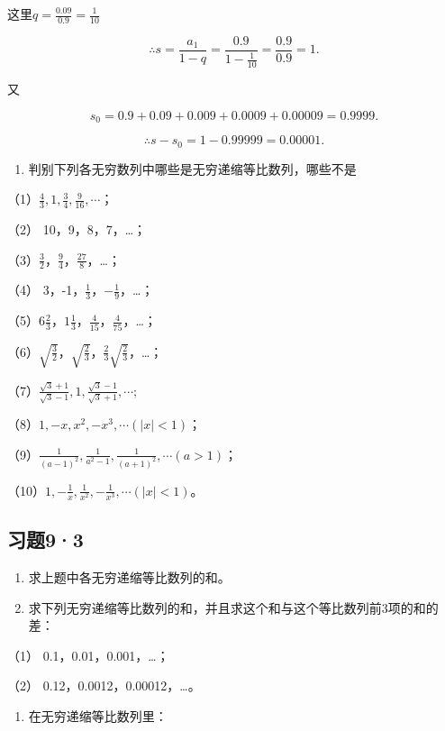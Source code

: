  这里\(q = \frac{0.09}{0.9} = \frac{1}{10}\)

\[
\therefore s = \frac{a_{1}}{1 - q} = \frac{0.9}{1 - \frac{1}{10}} = \frac{0.9}{0.9} = 1.
\]

又

\[
s_{0} = 0.9 + 0.09 + 0.009 + 0.0009 + 0.00009 = 0.9999.
\]

\[
\therefore s - s_{0} = 1 - 0.99999 = 0.00001.
\]

\begin{enumerate}
\item
  判别下列各无穷数列中哪些是无穷递缩等比数列，哪些不是
\end{enumerate}

（1）\(\frac{4}{3}, 1, \frac{3}{4}, \frac{9}{16}, \cdots\)；

（2） 10，9，8，7，\ldots；

（3）\(\frac{3}{2}\)，\(\frac{9}{4}\)，\(\frac{27}{8}\)，\ldots；

（4） 3，-1，\(\frac{1}{3}\)，\(-\frac{1}{9}\)，\ldots；

（5）\(6\frac{2}{3}\)，\(1\frac{1}{3}\)，\(\frac{4}{15}\)，\(\frac{4}{75}\)，\ldots；

（6）\(\sqrt{\frac{3}{2}}\)，\(\sqrt{\frac{2}{3}}\)，\(\frac{2}{3}\sqrt{\frac{2}{3}}\)，\ldots；

（7）\(\frac{\sqrt{3} + 1}{\sqrt{3} - 1}, 1, \frac{\sqrt{3} - 1}{\sqrt{3} + 1}, \cdots;\)

（8）\(1, -x, x^{2}, -x^{3}, \cdots (|x| < 1)\)；

（9）\(\frac{1}{(a - 1)^2}, \frac{1}{a^2 - 1}, \frac{1}{(a + 1)^2}, \cdots (a > 1)\)；

（10）\(1, -\frac{1}{x}, \frac{1}{x^2}, -\frac{1}{x^3}, \cdots (|x| < 1)\)。

\subsection{习题9·3}

\begin{enumerate}[start=2]
\item
  求上题中各无穷递缩等比数列的和。
\item
  求下列无穷递缩等比数列的和，并且求这个和与这个等比数列前3项的和的差：
\end{enumerate}

（1） 0.1，0.01，0.001，\ldots；

（2） 0.12，0.0012，0.00012，\ldots。

\begin{enumerate}[start=4]
\item
  在无穷递缩等比数列里：
\end{enumerate}

